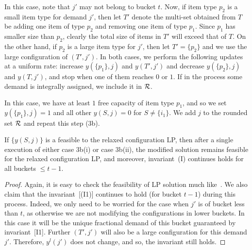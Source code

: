 \medskip {}
In this case, note that $j'$ may not belong to bucket $t$. Now, if item type $p_2$ is a small item type for demand $j'$, then let $T'$ denote the multi-set obtained from $T$ be adding one item of type $p_2$ and removing one item of type $p_1$. Since $p_1$ has smaller size than $p_2$, clearly the total size of items in $T'$ will exceed that of $T$. On the other hand, if $p_2$ is a large item type for $j'$, then let $T' = \{p_2\}$ and we use the large configuration of $(T',j')$. In both cases, we perform the following updates at a uniform rate: increase $y(\{p_1\},j)$ and $y(T',j')$ and decrease $y(\{p_2\},j)$ and $y(T,j')$, and stop when one of them reaches $0$ or $1$. If in the process some demand is integrally assigned, we include it in ${\cal R}$.

\medskip {}
In this case, we have at least $1$ free capacity of item type $p_1$, and so we set $y(\{p_1\},j)= 1$ and all other $y(S,j) = 0$ for $S \neq \{i_1\}$. We add $j$ to the rounded set ${\cal R}$ and repeat this step (3b).


\begin{claim} \label{cl:step3b}
If $\{y(S,j)\}$ is a feasible to the relaxed configuration LP, then after a single execution of either case 3b(i) or case 3b(ii), the modified solution remains feasible for the relaxed configuration LP, and moreover, invariant~(I) continues holds for all buckets $\leq t-1$. 
\end{claim}
\begin{proof}
Again, it is easy to check the feasibility of LP solution much like~. We also claim that the invariant~[(I1)] continues to hold (for bucket $t-1$) during this process. Indeed, we only need to be worried for the case when $j'$ is of bucket less than $t$, as otherwise we are not modifying the configurations in lower buckets. In this case it will be the unique fractional demand of this bucket guaranteed by invariant~[I1]. Further $(T',j')$ will also be a large configuration for this demand $j'$. Therefore, $y^l(j')$ does not change, and so, the invariant still holds.
\end{proof}

